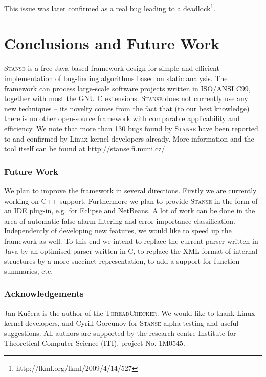 \documentclass{llncs}
\newcommand{\Stanse}{\textsc{Stanse}\xspace}
\newcommand{\TC}{\textsc{ThreadChecker}\xspace}
\begin{document}
This issue was later confirmed as a real bug leading to a
deadlock\footnote{http://lkml.org/lkml/2009/4/14/527}.


\section{Conclusions and Future Work}

\Stanse is a free Java-based framework design for simple and efficient implementation of
bug-finding algorithms based on static analysis. The framework can process
large-scale software projects written in ISO/ANSI C99, together with most
the GNU C extensions. \Stanse does not
currently use any new techniques -- its novelty comes from the fact that (to
our best knowledge) there is no other open-source framework with comparable
applicability and efficiency. We note that more than 130 bugs found by
\Stanse have been reported to and confirmed by Linux kernel developers
already. More information and the tool itself can be found at
\url{http://stanse.fi.muni.cz/}.

\subsubsection{Future Work}
We plan to improve the framework in several directions. Firstly we are currently
working on C++ support. Furthermore we plan to provide \Stanse in the form of
an IDE plug-in, e.g. for Eclipse and NetBeans. A lot of work can be done in the area
of automatic false alarm filtering and error importance classification.
Independently of developing new features, we would like to speed up the
framework as well. To this end we intend to replace the current parser
written in Java by an optimised parser written in C, to replace the XML
format of internal structures by a more succinct representation, to add a
support for function summaries, etc.


\subsubsection{Acknowledgements}
\label{sec:acknowledgements}

Jan Ku\v{c}era is the author of the \TC. We would like to thank Linux kernel
developers, and Cyrill Gorcunov for \Stanse alpha testing and useful
suggestions. All authors are supported by the research centre Institute for
Theoretical Computer Science (ITI), project No. 1M0545.
\end{document}
